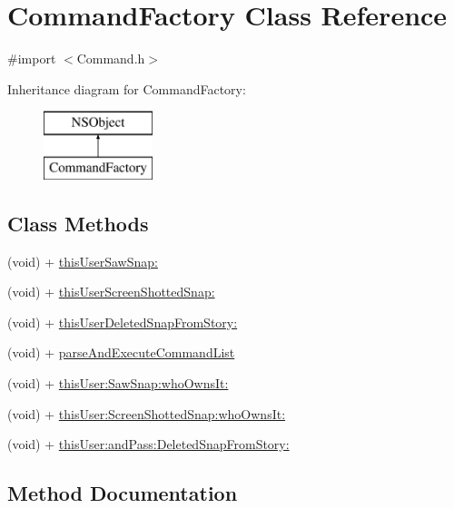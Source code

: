 \hypertarget{interface_command_factory}{}\section{Command\+Factory Class Reference}
\label{interface_command_factory}


{\ttfamily \#import $<$Command.\+h$>$}

Inheritance diagram for Command\+Factory\+:\begin{figure}[H]
\begin{center}
\leavevmode
\includegraphics[height=2.000000cm]{interface_command_factory}
\end{center}
\end{figure}
\subsection*{Class Methods}
\begin{DoxyCompactItemize}
\item 
(void) + \hyperlink{interface_command_factory_a9d8bd168e2d18eb390fd0954e4363f6f}{this\+User\+Saw\+Snap\+:}
\item 
(void) + \hyperlink{interface_command_factory_a588a6fa21e8014e73b266f46c11ff113}{this\+User\+Screen\+Shotted\+Snap\+:}
\item 
(void) + \hyperlink{interface_command_factory_a1b6d6ea45699e302c3f893097a15d8a8}{this\+User\+Deleted\+Snap\+From\+Story\+:}
\item 
(void) + \hyperlink{interface_command_factory_a3443e754f897cf8df9f488ae6dacbb63}{parse\+And\+Execute\+Command\+List}
\item 
(void) + \hyperlink{interface_command_factory_a68b40946a13884b50b60245f1cc9e03d}{this\+User\+:\+Saw\+Snap\+:who\+Owns\+It\+:}
\item 
(void) + \hyperlink{interface_command_factory_a2c6cb3673a158b7a668dc642ff4d795c}{this\+User\+:\+Screen\+Shotted\+Snap\+:who\+Owns\+It\+:}
\item 
(void) + \hyperlink{interface_command_factory_a29062efc02ac95b916f5b2f9056d0678}{this\+User\+:and\+Pass\+:\+Deleted\+Snap\+From\+Story\+:}
\end{DoxyCompactItemize}


\subsection{Method Documentation}
\hypertarget{interface_command_factory_a3443e754f897cf8df9f488ae6dacbb63}{}\label{interface_command_factory_a3443e754f897cf8df9f488ae6dacbb63} 
